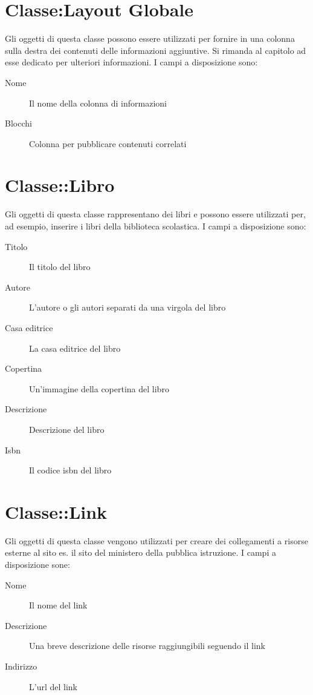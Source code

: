 \section{Classe:Layout Globale}
Gli oggetti di questa classe possono essere utilizzati per fornire in una colonna sulla destra dei contenuti delle informazioni aggiuntive. Si rimanda al capitolo ad esse dedicato per ulteriori informazioni. I campi a disposizione sono:
\begin{description}
 \item[Nome]Il nome della colonna di informazioni
\item[Blocchi] Colonna per pubblicare contenuti correlati
\end{description}

\section{Classe::Libro}
Gli oggetti di questa classe rappresentano dei libri e possono essere utilizzati per, ad esempio, inserire i libri della biblioteca scolastica. I campi a disposizione sono:
\begin{description}
\item[Titolo]Il titolo del libro
\item[Autore]L'autore o gli autori separati da una virgola del libro
\item[Casa editrice]La casa editrice del libro
\item[Copertina]Un'immagine della copertina del libro
\item[Descrizione]Descrizione del libro
\item[Isbn]Il codice isbn del libro
\end{description}

\section{Classe::Link}
Gli oggetti di questa classe vengono utilizzati per creare dei collegamenti a risorse esterne al sito es. il sito del ministero della pubblica istruzione. I campi a disposizione sone:
\begin{description}
 \item[Nome] Il nome del link
\item[Descrizione] Una breve descrizione delle risorse raggiungibili seguendo il link
\item[Indirizzo]L'url del link
\end{description}

